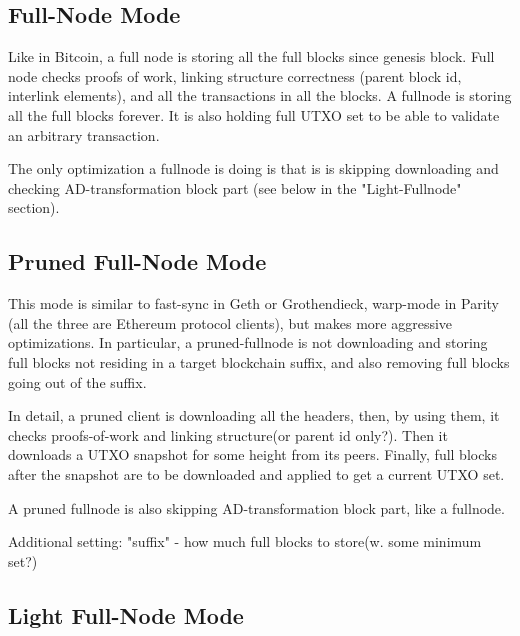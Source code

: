 \documentclass[]{report}   %
\begin{document}
\subsection{Full-Node Mode}  
\label{sec:fullnode}

  
Like in Bitcoin, a full node is storing all the full blocks since 
genesis block. Full node checks proofs of work, linking structure 
correctness (parent block id, interlink elements), and all the 
transactions in all the blocks. A fullnode is storing all the full 
blocks forever. It is also holding full UTXO set to be able to validate an 
arbitrary transaction. 

The only optimization a fullnode is doing is that is is skipping downloading and checking 
AD-transformation block part (see below in the "Light-Fullnode" section).

   
\subsection{Pruned Full-Node Mode}
\label{sec:pruned}

   
This mode is similar to fast-sync in Geth or Grothendieck, warp-mode 
in Parity (all the three are Ethereum protocol clients), but makes
 more aggressive optimizations. In particular, a pruned-fullnode is 
 not downloading and storing full blocks not residing in a target 
 blockchain suffix, and also removing full blocks going out of the suffix.
 
In detail, a pruned client is downloading all the headers, then, by using them,
  it checks proofs-of-work and linking structure(or parent id only?). Then it downloads a UTXO 
  snapshot for some height from its peers. Finally, full blocks after the snapshot are to be downloaded
   and applied to get a current UTXO set.
 
A pruned fullnode is also skipping AD-transformation block part, like a fullnode.      
   
Additional setting: "suffix" - how much full blocks to store(w. some minimum set?)
   
   
\subsection{Light Full-Node Mode}   
\label{sec:light-fullnode}


\end{document}
